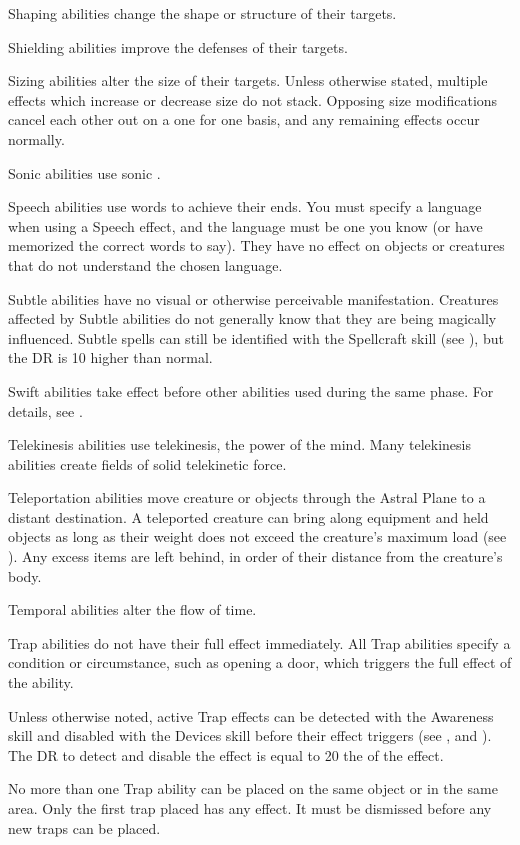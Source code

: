          Shaping abilities change the shape or structure of their targets.

         Shielding abilities improve the defenses of their targets.

         Sizing abilities alter the size of their targets.
        Unless otherwise stated, multiple effects which increase or decrease size do not stack.
        Opposing size modifications cancel each other out on a one for one basis, and any remaining effects occur normally.

         Sonic abilities use sonic .

         Speech abilities use words to achieve their ends.
        You must specify a language when using a Speech effect, and the language must be one you know (or have memorized the correct words to say). They have no effect on objects or creatures that do not understand the chosen language.

         Subtle abilities have no visual or otherwise perceivable manifestation.
        Creatures affected by Subtle abilities do not generally know that they are being magically influenced.
        Subtle spells can still be identified with the Spellcraft skill (see ), but the DR is 10 higher than normal.

         Swift abilities take effect before other abilities used during the same phase.
        For details, see .

         Telekinesis abilities use telekinesis, the power of the mind.
        Many telekinesis abilities create fields of solid telekinetic force.

         Teleportation abilities move creature or objects through the Astral Plane to a distant destination.
        A teleported creature can bring along equipment and held objects as long as their weight does not exceed the creature's maximum load (see ). Any excess items are left behind, in order of their distance from the creature's body.

         Temporal abilities alter the flow of time.

         Trap abilities do not have their full effect immediately.
        All Trap abilities specify a condition or circumstance, such as opening a door, which triggers the full effect of the ability.
        \par Unless otherwise noted, active Trap effects can be detected with the Awareness skill and disabled with the Devices skill before their effect triggers (see , and ).
        The DR to detect and disable the effect is equal to 20 \add the  of the effect.
        \par No more than one Trap ability can be placed on the same object or in the same area.
        Only the first trap placed has any effect.
        It must be dismissed before any new traps can be placed.

